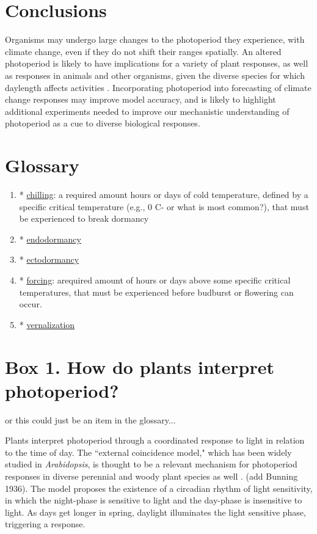 \documentclass{article}
\begin{document}
\section*{Conclusions}
Organisms may undergo large changes to the photoperiod they experience, with climate change, even if they do not shift their ranges spatially. An altered photoperiod is likely to have implications for a variety of plant responses, as well as responses in animals and other organisms, given the diverse species for which daylength affects activities \citep[e.g.,][] {taranger2003,bradshaw2006,mcallan2006,linn1996,Flynn:2018,solbakken1994}. Incorporating photoperiod into forecasting of climate change responses may improve model accuracy, and is likely to highlight additional experiments needed to improve our mechanistic understanding of photoperiod as a cue to diverse biological responses. 
\section* {Glossary}
\begin{enumerate}
\item* \underline{chilling}: a required amount hours or days of cold temperature, defined by a specific critical temperature (e.g., 0 \degree C- or what is most common?), that must be experienced to break dormancy

\item* \underline{endodormancy}
\item* \underline{ectodormancy} 
\item* \underline{forcing}: arequired amount of hours or days above some specific critical temperatures, that must be experienced before budburst or flowering can occur.
\item* \underline{vernalization}
\end{enumerate}
\section{Box 1. How do plants interpret photoperiod? }
\par or this could just be an item in the glossary...
\par Plants interpret photoperiod through a coordinated response to light in relation to the time of day. The ``external coincidence model," which has been widely studied in \emph{Arabidopsis}, is thought to be a relevant mechanism for photoperiod responses in diverse perennial and woody plant species as well \citep{davis2002,petterle2013,bastow2002,kobayashi2007,andres2012,Singh:2017}. (add Bunning 1936). The model proposes the existence of a circadian rhythm of light sensitivity, in which the night-phase is sensitive to light and the day-phase is insensitive to light. As days get longer in spring, daylight illuminates the  light sensitive phase, triggering a response.%
\end{document}

